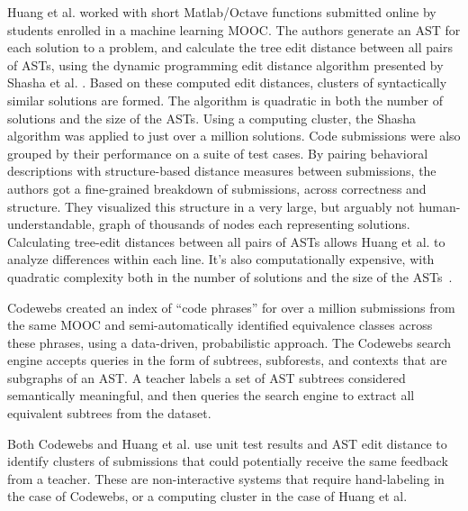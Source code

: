 
Huang et al. \citeyear{MOOCshop} worked with short Matlab/Octave functions submitted online by students enrolled in a machine learning MOOC. The authors generate an AST for each solution to a problem, and calculate the tree edit distance between all pairs of ASTs, using the dynamic programming edit distance algorithm presented by Shasha et al. \citeyear{shasha1994exact}. Based on these computed edit distances, clusters of syntactically similar solutions are formed. The algorithm is quadratic in both the number of solutions and the size of the ASTs. Using a computing cluster, the Shasha algorithm was applied to just over a million solutions. Code submissions were also grouped by their performance on a suite of test cases. By pairing behavioral descriptions with structure-based distance measures between submissions, the authors got a fine-grained breakdown of submissions, across correctness and structure. They visualized this structure in a very large, but arguably not human-understandable, graph of thousands of nodes each representing solutions. Calculating tree-edit distances between all pairs of ASTs allows Huang et al. to analyze differences within each line. It’s also computationally expensive, with quadratic complexity both in the number of solutions and the size of the ASTs~\cite{MOOCshop}. %

Codewebs \cite{codewebs} created an index of ``code phrases'' for over a million submissions from the same MOOC and semi-automatically identified equivalence classes across these phrases, using a data-driven, probabilistic approach. The Codewebs search engine accepts queries in the form of subtrees, subforests, and contexts that are subgraphs of an AST. A teacher labels a set of AST subtrees considered semantically meaningful, and then queries the search engine to extract all equivalent subtrees from the dataset. %

Both Codewebs \cite{codewebs} and Huang et al. \citeyear{MOOCshop} use unit test results and AST edit distance to identify clusters of submissions that could potentially receive the same feedback from a teacher. These are non-interactive systems that require hand-labeling in the case of Codewebs, or a computing cluster in the case of Huang et al. %


